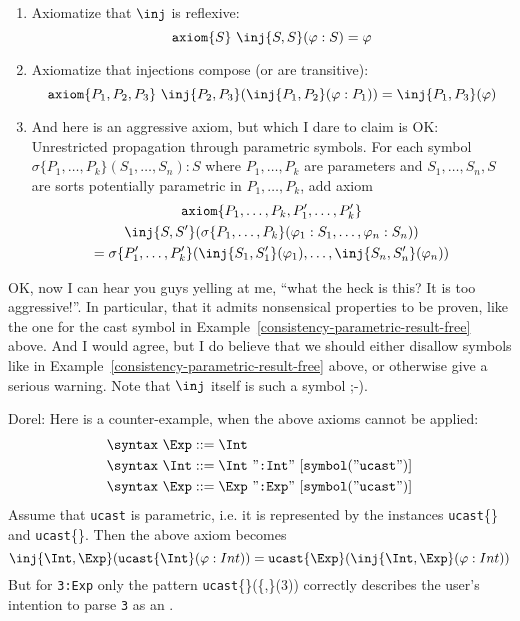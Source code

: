 \documentclass{article}
\newcommand\comment[2]{\par\noindent\color{red}#1: #2\color{black}\par\noindent}
\newcommand\dl{\comment{Dorel}}
\theoremstyle{definition}
\theoremstyle{definition}
\theoremstyle{definition}
\theoremstyle{definition}
\theoremstyle{definition}
\theoremstyle{theorem}
\theoremstyle{theorem}
\theoremstyle{theorem}
\theoremstyle{theorem}
\theoremstyle{theorem}
\newcommand{\KWsymbol}{\texttt{symbol}}
\newcommand{\axiom}{\texttt{axiom}}
\begin{document}
\begin{enumerate}[label=(\arabic*)]
\item\label{axiom-reflexive}
Axiomatize that \(\inj\) is reflexive:
\[\axiom\{S\}\ \inj\{S,S\}(\varphi:S) = \varphi\]

\item\label{axiom-transitive}
Axiomatize that injections compose (or are transitive):
\[\axiom\{P_1,P_2,P_3\}\ \inj\{P_2,P_3\}(\inj\{P_1,P_2\}(\varphi:P_1))
 = \inj\{P_1,P_3\}(\varphi)\]

\item\label{axiom-parametric-symbol}
And here is an aggressive axiom, but which I dare to claim is OK:
Unrestricted propagation through parametric symbols.
For each symbol \(\sigma\{P_1,\ldots,P_k\}(S_1,\ldots,S_n):S\)
where \(P_1,\ldots,P_k\) are parameters and
\(S_1,\ldots,S_n,S\) are sorts potentially parametric in
\(P_1,\ldots,P_k\), add axiom
\begin{multline*}
\axiom\{P_1,\ldots,P_k,P'_1,\ldots,P'_k\}\\
\inj\{S,S'\}(\sigma\{P_1,\ldots,P_k\}(\varphi_1:S_1,\ldots,\varphi_n:S_n))\\
= \sigma\{P'_1,\ldots,P'_k\}(\inj\{S_1,S'_1\}(\varphi_1),\ldots,\inj\{S_n,S'_n\}(\varphi_n))
\end{multline*}
\end{enumerate}

OK, now I can hear you guys yelling at me,
``what the heck is this? It is too aggressive!''.
In particular, that it admits nonsensical properties to be proven,
like the one for the cast symbol in Example~\ref{consistency-parametric-result-free} above.
And I would agree, but I do believe that we
should either disallow symbols like in Example~\ref{consistency-parametric-result-free}
above, or otherwise give a serious warning.
Note that \(\inj\) itself is such a symbol ;-).
\dl{
Here is a counter-example, when the above axioms cannot be applied:
\begin{align*}
&\syntax\ \Exp ::= \Int\\
&\syntax\ \Int ::= \Int\ "\texttt{:Int}"\ [\KWsymbol("\texttt{ucast}")]\\
&\syntax\ \Exp ::= \Exp\ "\texttt{:Exp}"\ [\KWsymbol("\texttt{ucast}")]
\end{align*}
Assume that \texttt{ucast} is parametric, i.e. it is represented by the instances \texttt{ucast}\{\Int\} and \texttt{ucast}\{\Exp\}.
Then the above axiom becomes 
\[
\inj\{\Int,\Exp\}(\texttt{ucast}\{\Int\}(\varphi:Int))=
\texttt{ucast}\{\Exp\}(\inj\{\Int,\Exp\}(\varphi:Int))
\]
But for \texttt{3:Exp} only the pattern \texttt{ucast}\{\Exp\}(\inj\{\Int,\Exp\}(3)) correctly describes the user's intention to parse \texttt{3} as an \Exp.
}
\end{document}
